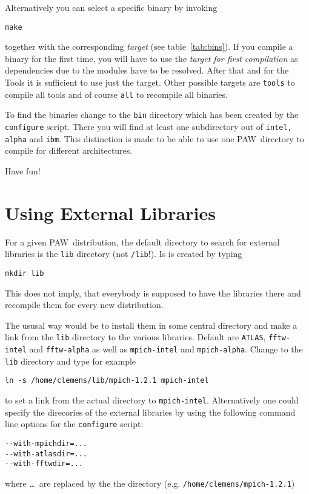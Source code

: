 \documentclass[a4paper,10pt]{article}
\newcommand{\PAW}{\textsc{PAW}}
\begin{document}
Alternatively you can select a specific binary by invoking
\begin{verbatim}
make
\end{verbatim}
together with the corresponding \emph{target} (see table~\ref{tab:bins}).  If
you compile a binary for the first time, you will have to use the \emph{target
for first compilation} as dependencies due to the modules have to be
resolved. After that and for the Tools it is sufficient to use just the target.
Other possible targets are \texttt{tools} to compile all tools and of course
\texttt{all} to recompile all binaries.

To find the binaries change to the \texttt{bin} directory which has been
created by the \texttt{configure} script.  There you will find at least one
subdirectory out of \texttt{intel, alpha} and \texttt{ibm}.  This
distinction is made to be able to use one \PAW\ directory to compile for
different architectures.

Have fun!


\section{Using External Libraries}
\label{sec:libs}

For a given \PAW\ distribution, the default directory to search for external
libraries is the \texttt{lib} directory (not \texttt{/lib}!). Is is created by typing
\begin{verbatim}
mkdir lib
\end{verbatim}
This does not imply, that everybody is supposed to have the libraries there and recompile them for every new distribution.  

The ususal way would be to install them in some central directory and make a link from the
\texttt{lib} directory to the various libraries.  Default are \texttt{ATLAS},
\texttt{fftw-intel} and \texttt{fftw-alpha} as well as \texttt{mpich-intel} and
\texttt{mpich-alpha}.  Change to the \texttt{lib} directory and type for example
\begin{verbatim}
ln -s /home/clemens/lib/mpich-1.2.1 mpich-intel
\end{verbatim}
to set a link from the actual directory to
\texttt{mpich-intel}. Alternatively one could specify the direcories of the
external libraries by using the following command line options for the
\texttt{configure} script:
\begin{verbatim}
--with-mpichdir=...
--with-atlasdir=...
--with-fftwdir=...
\end{verbatim}
where \ldots\ are replaced by the the directory (e.g. \texttt{/home/clemens/mpich-1.2.1})
\end{document}
